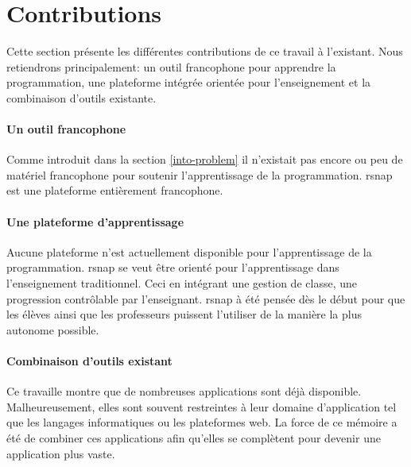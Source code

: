 ﻿\section{Contributions}
\label{intro-contribution}
Cette section présente les différentes contributions de ce travail à l'existant. Nous retiendrons principalement: un outil francophone pour apprendre la programmation, une plateforme intégrée orientée pour l'enseignement et la combinaison d'outils existante.

\paragraph{Un outil francophone} Comme introduit dans la section \ref{into-problem} il n'existait pas encore ou peu de matériel francophone pour soutenir l'apprentissage de la programmation. \gls{rsnap} est une plateforme entièrement francophone.%

\paragraph{Une plateforme d'apprentissage} Aucune plateforme n'est actuellement disponible pour l'apprentissage de la programmation. \gls{rsnap} se veut être orienté pour l'apprentissage dans l'enseignement traditionnel. Ceci en intégrant une gestion de classe, une progression contrôlable par l'enseignant. \gls{rsnap} à été pensée dès le début pour que les élèves ainsi que les professeurs puissent l'utiliser de la manière la plus autonome possible.

\paragraph{Combinaison d'outils existant} Ce travaille montre que de nombreuses applications sont déjà disponible. Malheureusement, elles sont souvent restreintes à leur domaine d'application tel que les langages informatiques ou les plateformes web. La force de ce mémoire a été de combiner ces applications afin qu'elles se complètent pour devenir une application plus vaste.
